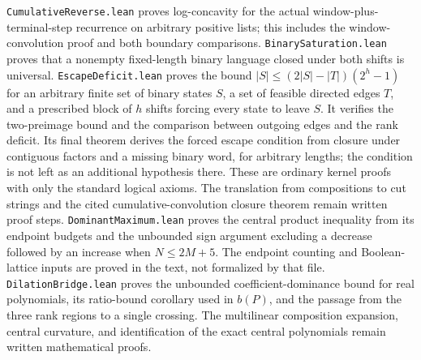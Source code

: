 \texttt{CumulativeReverse.lean} proves log-concavity for the actual
window-plus-terminal-step recurrence on arbitrary positive lists; this
includes the window-convolution proof and both boundary comparisons.
\texttt{BinarySaturation.lean} proves that a nonempty fixed-length binary
language closed under both shifts is universal.
\texttt{EscapeDeficit.lean} proves the bound
$|S|\le(2|S|-|T|)(2^h-1)$ for an arbitrary finite set of binary states
$S$, a set of feasible directed edges $T$, and a prescribed block of
$h$ shifts forcing every state to leave $S$. It verifies the two-preimage
bound and the comparison between outgoing edges and the rank deficit.
Its final theorem derives the forced escape condition from closure
under contiguous factors and a missing binary word, for arbitrary
lengths; the condition is not left as an additional hypothesis there.
These are ordinary kernel proofs with only the standard logical axioms.
The translation from compositions to cut strings and the cited
cumulative-convolution closure theorem remain written proof steps.
\texttt{DominantMaximum.lean} proves the central product inequality
from its endpoint budgets and the unbounded sign argument excluding a
decrease followed by an increase when $N\le2M+5$. The endpoint counting
and Boolean-lattice inputs are proved in the text, not formalized by
that file.
\texttt{DilationBridge.lean} proves the unbounded coefficient-dominance
bound for real polynomials, its ratio-bound corollary used in $b(P)$,
and the passage from the three rank regions to a single crossing.
The multilinear composition expansion, central curvature, and
identification of the exact central polynomials remain written
mathematical proofs.

